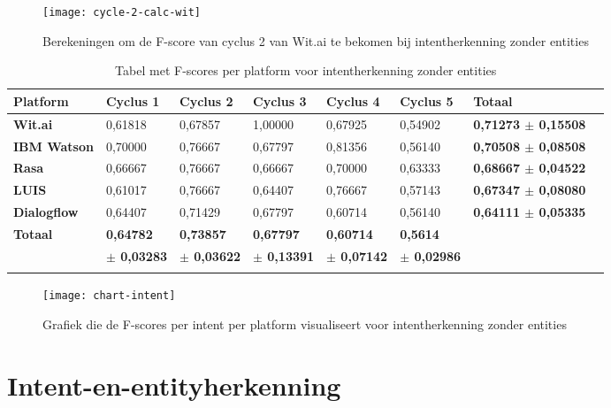 \begin{figure}[H]
    \label{fig:cycle-2-calc-wit}
    \centering
    \texttt{[image: cycle-2-calc-wit]}
    \caption{Berekeningen om de F-score van cyclus 2 van Wit.ai te bekomen bij intentherkenning zonder entities}
\end{figure}

\begin{center}
    \begin{longtable}{| l | l | l | l | l |  l | l | l |}
        \hline
        \textbf{Platform} & \textbf{Cyclus 1} & \textbf{Cyclus 2} & \textbf{Cyclus 3} & \textbf{Cyclus 4} & \textbf{Cyclus 5} & \textbf{Totaal} \\ \hline
         \textbf{Wit.ai} & 0,61818 & 0,67857 & 1,00000 & 0,67925 & 0,54902 & \textbf{0,71273 $\pm$ 0,15508} \\ \hline  
        \textbf{IBM Watson} & 0,70000 & 0,76667 & 0,67797 & 0,81356 & 0,56140 & \textbf{0,70508 $\pm$ 0,08508} \\ \hline 
         \textbf{Rasa} & 0,66667 & 0,76667 & 0,66667 & 0,70000 & 0,63333 & \textbf{0,68667 $\pm$ 0,04522} \\ \hline 
        \textbf{LUIS} & 0,61017 & 0,76667 & 0,64407 & 0,76667 & 0,57143 & \textbf{0,67347 $\pm$ 0,08080} \\ \hline           
        \textbf{Dialogflow} & 0,64407 & 0,71429 & 0,67797 & 0,60714 & 0,56140 & \textbf{0,64111 $\pm$ 0,05335} \\ \hline  
        \textbf{Totaal} & \textbf{0,64782} & \textbf{0,73857} & \textbf{0,67797} & \textbf{0,60714} & \textbf{0,5614} &    \\
        & \textbf{$\pm$ 0,03283} & \textbf{$\pm$ 0,03622} & \textbf{$\pm$ 0,13391} & \textbf{$\pm$ 0,07142} & \textbf{$\pm$ 0,02986} &    \\ \hline
        \caption{Tabel met F-scores per platform voor intentherkenning zonder entities}                                    
    \end{longtable}
    \label{tbl:results-intent-no-entity}
\end{center}

\begin{figure}[H]
    \label{fig:chart-intent-no-entity}
    \centering
    \texttt{[image: chart-intent]}
    \caption{Grafiek die de F-scores per intent per platform visualiseert voor intentherkenning zonder entities}
\end{figure}

\section{Intent-en-entityherkenning}

